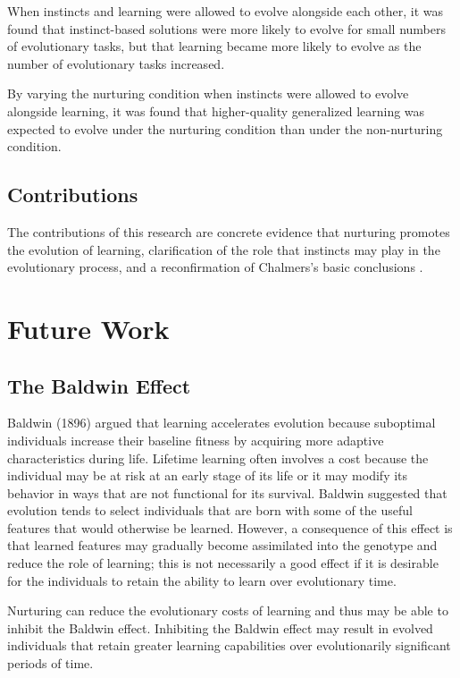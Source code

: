 \documentclass[master]{outhesis}
\begin{document}
When instincts and learning were allowed to evolve alongside each other, 
it was found that instinct-based solutions were more likely to evolve for small numbers of evolutionary tasks, 
but that learning became more likely to evolve as the number of evolutionary tasks increased.

By varying the nurturing condition when instincts were allowed to evolve alongside learning, 
it was found that higher-quality generalized learning was expected to evolve under the nurturing condition than under the non-nurturing condition.

\section{Contributions}

The contributions of this research are
concrete evidence that nurturing promotes the evolution of learning,
clarification of the role that instincts may play in the evolutionary process,
and a reconfirmation of Chalmers's basic conclusions \cite{chalmers-evolution-learning}.

\chapter{Future Work}

\section{The Baldwin Effect}

Baldwin (1896) argued that learning accelerates evolution because suboptimal individuals increase their baseline fitness by acquiring more adaptive characteristics during life. 
Lifetime learning often involves a cost because the individual may be at risk at an early stage of its life or it may modify its behavior in ways that are not functional for its survival.
Baldwin suggested that evolution tends to select individuals that are born with some of the useful features that would otherwise be learned.
However, a consequence of this effect is that learned features may gradually become assimilated into the genotype and reduce the role of learning;
this is not necessarily a good effect if it is desirable for the individuals to retain the ability to learn over evolutionary time. \cite{Floreano:2008wv} 

Nurturing can reduce the evolutionary costs of learning and thus may be able to inhibit the Baldwin effect.
Inhibiting the Baldwin effect may result in evolved individuals that retain greater learning capabilities over evolutionarily significant periods of time.

{}


\makebackmatter
\end{document}
